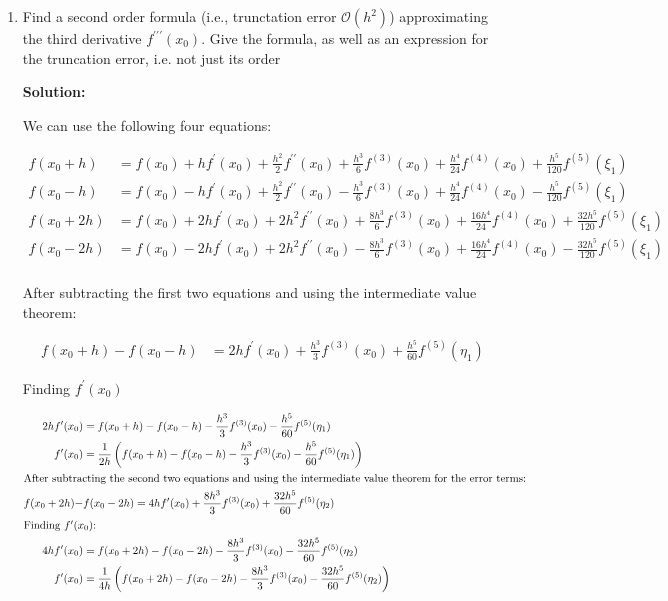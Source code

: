 \documentclass[12pt]{article}
\newcommand{\pprime}{\prime \prime}
\newcommand{\BigO}[1]{\mathcal{O}\left( #1 \right)}
\begin{document}
\begin{enumerate}
\begin{enumerate}
\item Find a second order formula (i.e., trunctation error $\BigO{h^{2}}$) approximating the third derivative $f^{\prime \prime \prime}(x_{0})$. Give the formula, as well as an expression for the truncation error, i.e. not just its order

{\bf Solution:}

We can use the following four equations:

\begin{align*}
f(x_{0}+h) &= f(x_{0}) + hf^{\prime}(x_{0}) + \frac{h^{2}}{2}f^{\pprime}(x_0) + \frac{h^{3}}{6}f^{(3)}(x_{0}) + \frac{h^{4}}{24}f^{(4)}(x_{0}) + \frac{h^{5}}{120}f^{(5)}(\xi_{1})\\
f(x_{0}-h) &= f(x_{0}) - hf^{\prime}(x_{0}) + \frac{h^{2}}{2}f^{\pprime}(x_0) - \frac{h^{3}}{6}f^{(3)}(x_{0}) + \frac{h^{4}}{24}f^{(4)}(x_{0}) - \frac{h^{5}}{120}f^{(5)}(\xi_{1})\\
f(x_{0}+2h) &= f(x_{0}) + 2hf^{\prime}(x_{0}) + 2h^{2}f^{\pprime}(x_0) + \frac{8h^{3}}{6}f^{(3)}(x_{0}) + \frac{16h^{4}}{24}f^{(4)}(x_{0}) + \frac{32h^{5}}{120}f^{(5)}(\xi_{1})\\
f(x_{0}-2h) &= f(x_{0}) - 2hf^{\prime}(x_{0}) + 2h^{2}f^{\pprime}(x_0) - \frac{8h^{3}}{6}f^{(3)}(x_{0}) + \frac{16h^{4}}{24}f^{(4)}(x_{0}) - \frac{32h^{5}}{120}f^{(5)}(\xi_{1})\\
\end{align*}

After subtracting the first two equations and using the intermediate value theorem:

\begin{align*}
f(x_{0} + h) - f(x_{0} - h) &= 2hf^{\prime}(x_{0}) + \frac{h^{3}}{3}f^{(3)}(x_{0}) + \frac{h^{5}}{60}f^{(5)}(\eta_{1})
\end{align*}

Finding $f^{\prime}(x_{0})$

\begin{align*}
2hf^{\prime}(x_{0}) &= f(x_{0} + h) - f(x_{0} - h) - \frac{h^{3}}{3}f^{(3)}(x_{0}) - \frac{h^{5}}{60}f^{(5)}(\eta_{1})\\
f^{\prime}(x_{0}) &= \frac{1}{2h}\left( f(x_{0} + h) - f(x_{0} - h) - \frac{h^{3}}{3}f^{(3)}(x_{0}) - \frac{h^{5}}{60}f^{(5)}(\eta_{1})\right)\\
\intertext{After subtracting the second two equations and using the intermediate value theorem for the error terms:}
f(x_{0} + 2h) -& f(x_{0} - 2h) = 4hf^{\prime}(x_{0}) + \frac{8h^{3}}{3}f^{(3)}(x_{0}) + \frac{32h^{5}}{60}f^{(5)}(\eta_{2})\\
\intertext{Finding $f^{\prime}(x_{0})$:}
4hf^{\prime}(x_{0}) &= f(x_{0} + 2h) - f(x_{0} - 2h) - \frac{8h^{3}}{3}f^{(3)}(x_{0}) - \frac{32h^{5}}{60}f^{(5)}(\eta_{2})\\
f^{\prime}(x_{0}) &= \frac{1}{4h}\left( f(x_{0} + 2h) - f(x_{0} - 2h) - \frac{8h^{3}}{3}f^{(3)}(x_{0}) - \frac{32h^{5}}{60}f^{(5)}(\eta_{2})\right)
\end{align*}


\end{enumerate}
\end{enumerate}
\end{document}
